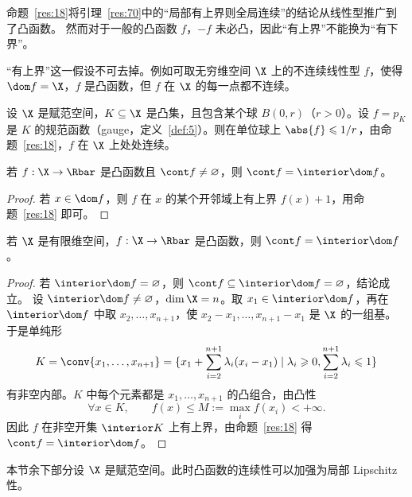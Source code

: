\begin{remark}
\label{rem:4}
命题~\ref{res:18}将引理~\ref{res:70}中的“局部有上界则全局连续”的结论从线性型推广到了凸函数。
然而对于一般的凸函数 $f$，$-f$ 未必凸，因此“有上界”不能换为“有下界”。
\end{remark}

\begin{remark}
\label{rem:5}
“有上界”这一假设不可去掉。例如可取无穷维空间 $\X$ 上的不连续线性型 $f$，使得 $\dom f=\X$，$f$ 是凸函数，但 $f$ 在 $\X$ 的每一点都不连续。
\end{remark}

\begin{example}
\label{exa:6}
设 $\X$ 是赋范空间，$K\subseteq\X$ 是凸集，且包含某个球 $B(0,r)$（$r>0$）。设 $f=p_K$ 是 $K$ 的规范函数（gauge，定义~\ref{def:5}）。则在单位球上 $\abs{f}\leqslant1/r$，由命题~\ref{res:18}，$f$ 在 $\X$ 上处处连续。
\end{example}

\begin{corollary}
\label{res:19}
若 $f:\X\to\Rbar$ 是凸函数且 $\cont f\neq\varnothing$，则 $\cont f=\interior\dom f$。
\end{corollary}

\begin{proof}
若 $x\in\dom f$，则 $f$ 在 $x$ 的某个开邻域上有上界 $f(x)+1$，用命题~\ref{res:18} 即可。
\end{proof}

\begin{corollary}
\label{res:20}
若 $\X$ 是有限维空间，$f:\X\to\Rbar$ 是凸函数，则 $\cont f=\interior\dom f$。
\end{corollary}

\begin{proof}
若 $\interior\dom f=\varnothing$，则 $\cont f\subseteq\interior\dom f=\varnothing$，结论成立。
设 $\interior\dom f\neq\varnothing$，$\dim\X=n$。取 $x_1\in\interior\dom f$，再在 $\interior\dom f$ 中取 $x_2,\dots,x_{n+1}$，使 $x_2-x_1,\dots,x_{n+1}-x_1$ 是 $\X$ 的一组基。
于是单纯形 
\[K=\conv\{x_1,\dots,x_{n+1}\}=\{x_1+\sum_{i=2}^{n+1}\lambda_i(x_i-x_1)\mid \lambda_i\geqslant0,\sum_{i=2}^{n+1}\lambda_i\leqslant1\}\]
有非空内部。$K$ 中每个元素都是 $x_1,\dots,x_{n+1}$ 的凸组合，由凸性
\[
  \forall x\in K,\qquad f(x)\leqslant M:=\max_i f(x_i)<+\infty .
\]
因此 $f$ 在非空开集 $\interior K$ 上有上界，由命题~\ref{res:18} 得 $\cont f=\interior\dom f$。
\end{proof}

本节余下部分设 $\X$ 是赋范空间。此时凸函数的连续性可以加强为局部 Lipschitz 性。

